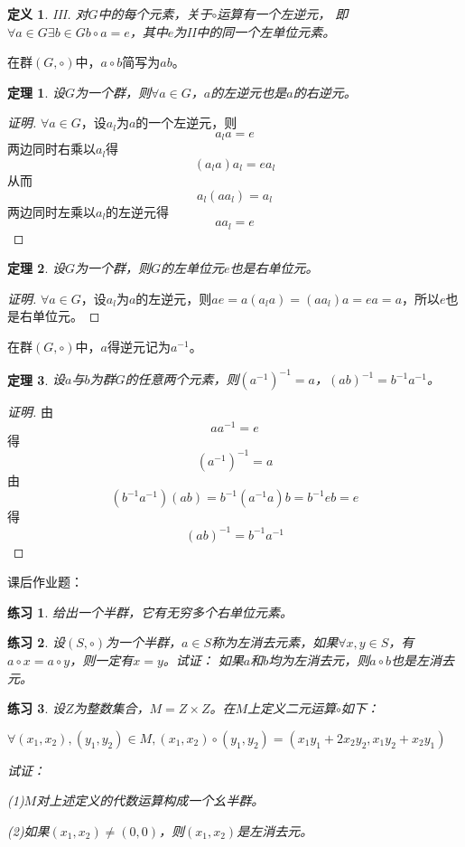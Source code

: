 \documentclass{article}
\newtheorem{Def}{定义}
\newtheorem{Thm}{定理}
\newtheorem{Exercise}{练习}
\begin{document}
\begin{CJK*}{UTF8}{gbsn}
\begin{Def}
  III. 对$G$中的每个元素，关于$\circ$运算有一个左逆元，
  即$\forall a\in G \exists b\in G b\circ a = e$，其中$e$为II中的同一个左单位元素。
\end{Def}
在群$(G,\circ)$中，$a\circ b$简写为$ab$。
\begin{Thm}
  设$G$为一个群，则$\forall a\in G$，$a$的左逆元也是$a$的右逆元。
\end{Thm}
\begin{proof}[证明]
  $\forall a\in G$，设$a_l$为$a$的一个左逆元，则
  \[a_la=e\]
  两边同时右乘以$a_l$得
  \[(a_la)a_l=ea_l\]
  从而
  \[a_l(aa_l)=a_l\]
  两边同时左乘以$a_l$的左逆元得
  \[aa_l=e\]
\end{proof}
\begin{Thm}
  设$G$为一个群，则$G$的左单位元$e$也是右单位元。
\end{Thm}
\begin{proof}[证明]
  $\forall a\in G$，设$a_l$为$a$的左逆元，则$ae=a(a_la)=(aa_l)a=ea=a$，所以$e$也是右单位元。
\end{proof}
在群$(G,\circ)$中，$a$得逆元记为$a^{-1}$。
\begin{Thm}
  设$a$与$b$为群$G$的任意两个元素，则$(a^{-1})^{-1}=a$，$(ab)^{-1}=b^{-1}a^{-1}$。
\end{Thm}
\begin{proof}[证明]
  由\[aa^{-1}=e\]
  得\[(a^{-1})^{-1}=a\]
由\[(b^{-1}a^{-1})(ab)=b^{-1}(a^{-1}a)b=b^{-1}eb=e\]
得\[(ab)^{-1}=b^{-1}a^{-1}\]
\end{proof}

  课后作业题：

\begin{Exercise}
  给出一个半群，它有无穷多个右单位元素。
\end{Exercise}

\begin{Exercise}
  设$(S,\circ)$为一个半群，$a\in S$称为左消去元素，如果$\forall x, y\in S$，有$a\circ x=a\circ y$，则一定有$x=y$。试证：
  如果$a$和$b$均为左消去元，则$a\circ b$也是左消去元。
\end{Exercise}

\begin{Exercise}
  设$Z$为整数集合，$M=Z\times Z$。在$M$上定义二元运算$\circ$如下：

  $\forall (x_1,x_2), (y_1,y_2)\in M, (x_1,x_2)\circ (y_1,y_2)=(x_1y_1+2x_2y_2,x_1y_2+x_2y_1)$

  试证：

  (1)$M$对上述定义的代数运算构成一个幺半群。

  (2)如果$(x_1,x_2)\neq (0,0)$，则$(x_1,x_2)$是左消去元。


\end{Exercise}
\end{CJK*}
\end{document}
